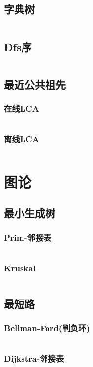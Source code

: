 \documentclass[a4paper,11pt]{article}
\begin{document}
\subsection{字典树}
\inputminted[breaklines]{c++}{数据结构/字典树_Trie-链表.cpp}
\subsection{Dfs序}
\inputminted[breaklines]{c++}{数据结构/Dfs序.cpp}
\subsection{最近公共祖先}
\subsubsection{在线LCA}
\inputminted[breaklines]{c++}{数据结构/在线LCA-DFS+ST.cpp}
\subsubsection{离线LCA}
\inputminted[breaklines]{c++}{数据结构/离线LCA-Tarjan.cpp}
\section{图论}
\subsection{最小生成树}
\subsubsection{Prim-邻接表}
\inputminted[breaklines]{c++}{图论/Prim-邻接表.cpp}
\subsubsection{Kruskal}
\inputminted[breaklines]{c++}{图论/Kruskal.cpp}
\subsection{最短路}
\subsubsection{Bellman-Ford(判负环)}
\inputminted[breaklines]{c++}{图论/Bellman-Ford.cpp}
\subsubsection{Dijkstra-邻接表}
\inputminted[breaklines]{c++}{图论/Dijkstra-邻接表.cpp}
\end{document}
